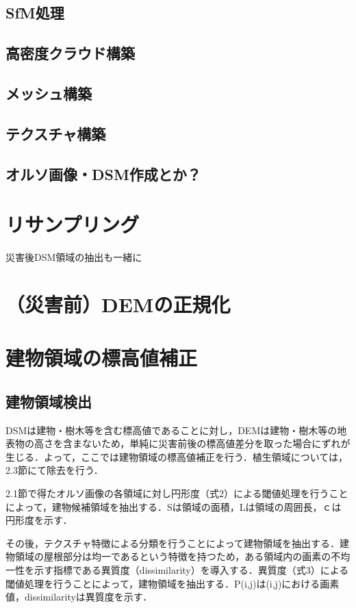     \subsection{SfM処理}
    \subsection{高密度クラウド構築}
    \subsection{メッシュ構築}
    \subsection{テクスチャ構築}
    \subsection{オルソ画像・DSM作成とか？}
    

  \section{リサンプリング}
  災害後DSM領域の抽出も一緒に


  \section{（災害前）DEMの正規化}
  
  \section{建物領域の標高値補正}
    \subsection{建物領域検出}
      DSMは建物・樹木等を含む標高値であることに対し，DEMは建物・樹木等の地表物の高さを含まないため，単純に災害前後の標高値差分を取った場合にずれが生じる．よって，ここでは建物領域の標高値補正を行う．植生領域については，2.3節にて除去を行う．
  
      2.1節で得たオルソ画像の各領域に対し円形度（式2）による閾値処理を行うことによって，建物候補領域を抽出する．Sは領域の面積，Lは領域の周囲長，ｃは円形度を示す．
    
      その後，テクスチャ特徴による分類を行うことによって建物領域を抽出する．建物領域の屋根部分は均一であるという特徴を持つため，ある領域内の画素の不均一性を示す指標である異質度（dissimilarity）\cite{論文手法3}を導入する．異質度（式3）による閾値処理を行うことによって，建物領域を抽出する．P(i,j)は(i,j)における画素値，dissimilarityは異質度を示す．

